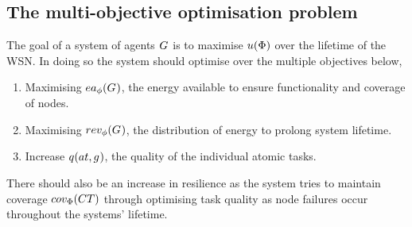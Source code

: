 \subsection{The multi-objective optimisation problem}
\label{section:optimisation_problem}

The goal of a system of agents $G_{}^{}$ is to maximise $\functionSystemUtility{}{}$ over the lifetime of the WSN. In doing so the system should optimise over the multiple objectives below, 
\begin{enumerate}
	\item Maximising $\functionEnergyAvailable{}{}$, the energy available to ensure functionality and coverage of nodes.
	\item Maximising $\functionEnergyVariability{}{}$,  the distribution of energy to prolong system lifetime.
	\item Increase $\functionAtomicTaskQualitySignature{}{}$, the quality of the individual atomic tasks.
\end{enumerate}
There should also be an increase in resilience as the system tries to maintain coverage $\functionSystemCoverage{}{}$ through optimising task quality as node failures occur throughout the systems' lifetime.

